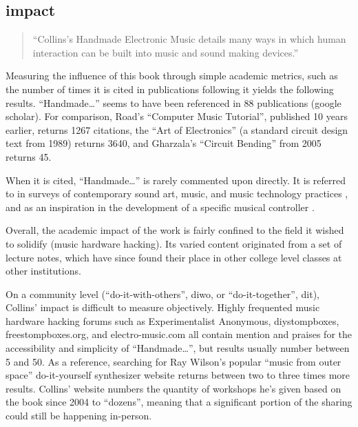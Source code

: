 \begin{itemize}
\subsection{impact}  

\begin{quote}

“Collins’s Handmade Electronic Music details many ways in which human interaction can be built into music and sound making devices.” \citep{mills2010}

\end{quote}

	Measuring the influence of this book through simple academic metrics, such as the number of times it is cited in publications following it \citep{harzing2008} yields the following results. “Handmade…” seems to have been referenced in 88 publications (google scholar). For comparison, Road’s “Computer Music Tutorial”, published 10 years earlier, returns 1267 citations, the “Art of Electronics” (a standard circuit design text from 1989) returns 3640, and Gharzala’s “Circuit Bending” from 2005 returns 45. 

	When it is cited, “Handmade…” is rarely commented upon directly. It is referred to in surveys of contemporary sound art, music, and music technology practices \citep{kelly2011,mills2010,pigott2011,rodgers2010}, and as an inspiration in the development of a specific musical controller \citep{ariza2007,hoadley2010,murphy2010,riis2013,valle2011}.
	
	Overall, the academic impact of the work is fairly confined to the field it wished to solidify (music hardware hacking). Its varied content originated from a set of lecture notes, which have since found their place in other college level classes at other institutions. 

On a community level (“do-it-with-others”, diwo, or “do-it-together”, dit), Collins’ impact is difficult to measure objectively. Highly frequented music hardware hacking forums such as Experimentalist Anonymous, diystompboxes, freestompboxes.org, and electro-music.com all contain mention and praises for the accessibility and simplicity of “Handmade…”, but results usually number between 5 and 50. As a reference, searching for Ray Wilson’s popular “music from outer space” do-it-yourself synthesizer website returns between two to three times more results. Collins’ website numbers the quantity of workshops he’s given based on the book since 2004 to “dozens”, meaning that a significant portion of the sharing could still be happening in-person.  


\end{itemize}
